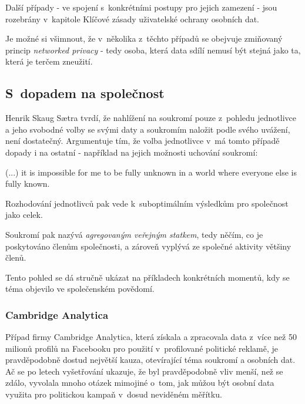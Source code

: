Další případy - ve spojení s~konkrétními postupy pro jejich zamezení - jsou rozebrány v~kapitole Klíčové zásady uživatelské ochrany osobních dat.

Je možné si všimnout, že v~několika z~těchto případů se obejvuje zmiňovaný princip \textit{networked privacy} - tedy osoba, která data sdílí nemusí být stejná jako ta, která je terčem zneužití.

\subsection{S~dopadem na společnost}
Henrik Skaug Sætra tvrdí, že nahlížení na soukromí pouze z~pohledu jednotlivce a jeho svobodné volby se svými daty a soukromím naložit podle svého uvážení, není dostatečný\citep{privacy-as-aggregate-public-good}. Argumentuje tím, že volba jednotlivce v~má tomto případě dopady i na ostatní - například na jejich možnosti uchování soukromí:

\begin{displayquote}
(...) it is impossible for me to be fully unknown in a world where everyone else is fully known.
\end{displayquote}

Rozhodování jednotlivců pak vede k~suboptimálním výsledkům pro společnost jako celek.

Soukromí pak nazývá \textit{agregovaným veřejným statkem}, tedy něčím, co je poskytováno členům společnosti, a zároveň vyplývá ze společné aktivity většiny členů.

Tento pohled se dá stručně ukázat na příkladech konkrétních momentů, kdy se téma objevilo ve společenském povědomí.

\subsubsection{Cambridge Analytica}
Případ firmy Cambridge Analytica, která získala a zpracovala data z~více než 50 milionů profilů na Facebooku\citep{cambridge-analytica} pro použití v~profilované politické reklamě, je pravděpodobně dostud největší kauza, otevírající téma soukromí a osobních dat. Ač se po letech vyšetřování ukazuje, že byl pravděpodobně vliv menší, než se zdálo\citep{ca-brexit}\citep{ca-elections}, vyvolala mnoho otázek mimojiné o~tom, jak můžou být osobní data využita pro politickou kampaň v~dosud neviděném měřítku.

